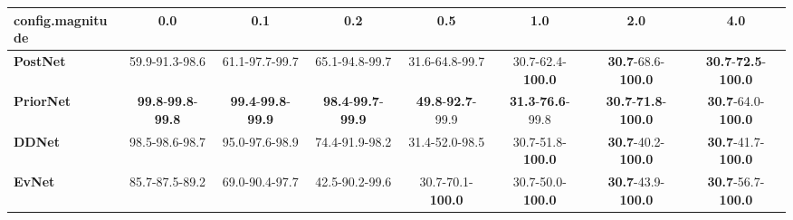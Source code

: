 \begin{tabular}{lccccccc}
\toprule
\textbf{config.magnitude} &                                        0.0 &                                        0.1 &                                        0.2 &                               0.5 &                               1.0 &                                         2.0 &                                         4.0 \\
\midrule
\textbf{PostNet } &                             59.9-91.3-98.6 &                             61.1-97.7-99.7 &                             65.1-94.8-99.7 &                    31.6-64.8-99.7 &          30.7-62.4-\textbf{100.0} &           \textbf{30.7}-68.6-\textbf{100.0} &  \textbf{30.7}-\textbf{72.5}-\textbf{100.0} \\
\textbf{PriorNet} &  \textbf{99.8}-\textbf{99.8}-\textbf{99.8} &  \textbf{99.4}-\textbf{99.8}-\textbf{99.9} &  \textbf{98.4}-\textbf{99.7}-\textbf{99.9} &  \textbf{49.8}-\textbf{92.7}-99.9 &  \textbf{31.3}-\textbf{76.6}-99.8 &  \textbf{30.7}-\textbf{71.8}-\textbf{100.0} &           \textbf{30.7}-64.0-\textbf{100.0} \\
\textbf{DDNet   } &                             98.5-98.6-98.7 &                             95.0-97.6-98.9 &                             74.4-91.9-98.2 &                    31.4-52.0-98.5 &          30.7-51.8-\textbf{100.0} &           \textbf{30.7}-40.2-\textbf{100.0} &           \textbf{30.7}-41.7-\textbf{100.0} \\
\textbf{EvNet   } &                             85.7-87.5-89.2 &                             69.0-90.4-97.7 &                             42.5-90.2-99.6 &          30.7-70.1-\textbf{100.0} &          30.7-50.0-\textbf{100.0} &           \textbf{30.7}-43.9-\textbf{100.0} &           \textbf{30.7}-56.7-\textbf{100.0} \\
\bottomrule
\end{tabular}
